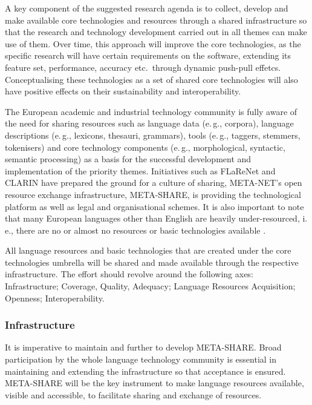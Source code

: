 \documentclass[10pt, plain]{../../metanetpaper}
\begin{document}
\begin{multicols}{2}
A key component of the suggested research agenda is to collect, develop and make available core technologies and resources through a shared infrastructure so that the research and technology development carried out in all themes can make use of them. Over time, this approach will improve the core technologies, as the specific research will have certain requirements on the software, extending its feature set, performance, accuracy etc.~through dynamic push-pull effetcs. Conceptualising these technologies as a set of shared core technologies will also have positive effects on their sustainability and interoperability.

The European academic and industrial technology community is fully aware of the need for sharing resources such as language data (e.\,g., corpora), language descriptions (e.\,g., lexicons, thesauri, grammars), tools (e.\,g., taggers, stemmers, tokenisers) and core technology components (e.\,g., morphological, syntactic, semantic processing) as a basis for the successful development and implementation of the priority themes. Initiatives such as FLaReNet \cite{flarenetsra2011} and CLARIN have prepared the ground for a culture of sharing, META-NET's open resource exchange infrastructure, META-SHARE, is providing the technological platform as well as legal and organisational schemes. It is also important to note that many European languages other than English are heavily under-resourced, i.\,e., there are no or almost no resources or basic technologies available \cite{LWP2012}.

All language resources and basic technologies that are created under the core technologies umbrella will be shared and made available through the respective infrastructure. The effort should revolve around the following axes: Infrastructure; Coverage, Quality, Adequacy; Language Resources Acquisition; Openness; Interoperability.

\subsubsection{Infrastructure}
\label{sec:infrastructure}

It is imperative to maintain and further to develop META-SHARE. Broad participation by the whole language technology community is essential in maintaining and extending the infrastructure so that acceptance is ensured. META-SHARE will be the key instrument to make language resources available, visible and accessible, to facilitate sharing and exchange of resources.


\end{multicols}
\end{document}
